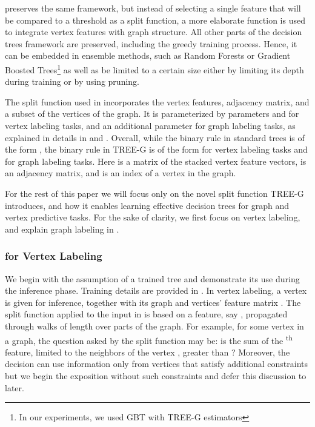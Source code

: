\acronym preserves the same framework, but instead of selecting a single feature that will be compared to a threshold as a split function, a more elaborate function  is used to integrate vertex features with graph structure. 
All other parts of the decision trees framework are preserved, including the greedy training process. Hence, it can be embedded in ensemble methods, such as Random Forests or Gradient Boosted Trees\footnote{In our experiments, we used GBT with TREE-G estimators} as well as be limited to a certain size either by limiting its depth during training or by using pruning.


The split function used in \acronym incorporates the vertex features, adjacency matrix, and a subset of the vertices of the graph. 
It is parameterized by  parameters  and  for vertex labeling tasks, and an additional parameter  for graph labeling tasks, as explained in details in  and . 
Overall, while the binary rule in standard trees is of the form , the binary rule in TREE-G is of the form  for vertex labeling tasks and  for graph labeling tasks. Here  is a matrix of the stacked vertex feature vectors,  is an adjacency matrix, and  is an index of a vertex in the graph.


For the rest of this paper we will focus only on the novel split function  TREE-G introduces, and how it enables learning effective decision trees for graph and vertex predictive tasks.
For the sake of clarity, we first focus on vertex labeling, and explain graph labeling in .























\subsubsection{\acronym for Vertex  Labeling}\label{subsection:vertex_level}
We begin with the assumption of a trained tree and demonstrate its use during the inference phase. Training details are provided in .
In vertex labeling, a vertex  is given for inference, together with its graph  and vertices' feature matrix .
The split function applied to the input in \acronym is based on a feature, say , propagated through walks of length  over parts of the graph. For example, for some vertex  in a graph, the question asked by the split function may be: is the sum of the \textsuperscript{th} feature, limited to the neighbors of the vertex , greater than ?  Moreover, the decision can use information only from vertices that satisfy additional constraints but we begin the exposition without such constraints and defer this discussion to later.

